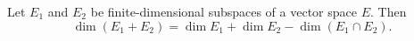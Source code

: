 Let $E_1$ and $E_2$ be finite-dimensional subspaces of a vector space $E$. Then
$$\dim(E_1 + E_2) = \dim E_1 + \dim E_2 - \dim(E_1 \cap E_2).$$
